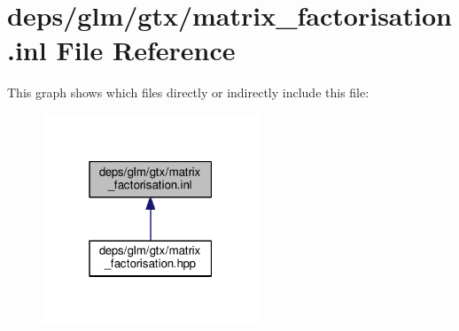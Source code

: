 \hypertarget{matrix__factorisation_8inl}{}\section{deps/glm/gtx/matrix\+\_\+factorisation.inl File Reference}
\label{matrix__factorisation_8inl}
This graph shows which files directly or indirectly include this file\+:
\nopagebreak
\begin{figure}[H]
\begin{center}
\leavevmode
\includegraphics[width=183pt]{d6/db7/matrix__factorisation_8inl__dep__incl}
\end{center}
\end{figure}
